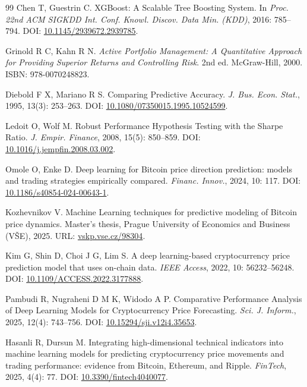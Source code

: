 \documentclass[12pt,a4paper]{ctexart}
\begin{document}
\begin{thebibliography}{99}
Chen T, Guestrin C.
XGBoost: A Scalable Tree Boosting System.
In \textit{Proc. 22nd ACM SIGKDD Int. Conf. Knowl. Discov. Data Min. (KDD)}, 2016: 785--794.
DOI: \href{https://doi.org/10.1145/2939672.2939785}{10.1145/2939672.2939785}.

Grinold R C, Kahn R N.
\textit{Active Portfolio Management: A Quantitative Approach for Providing Superior Returns and Controlling Risk}. 2nd ed. McGraw-Hill, 2000.
ISBN: 978-0070248823.

Diebold F X, Mariano R S.
Comparing Predictive Accuracy.
\textit{J. Bus. Econ. Stat.}, 1995, 13(3): 253--263.
DOI: \href{https://doi.org/10.1080/07350015.1995.10524599}{10.1080/07350015.1995.10524599}.

Ledoit O, Wolf M.
Robust Performance Hypothesis Testing with the Sharpe Ratio.
\textit{J. Empir. Finance}, 2008, 15(5): 850--859.
DOI: \href{https://doi.org/10.1016/j.jempfin.2008.03.002}{10.1016/j.jempfin.2008.03.002}.

Omole O, Enke D.
Deep learning for Bitcoin price direction prediction: models and trading strategies empirically compared.
\textit{Financ. Innov.}, 2024, 10: 117.
DOI: \href{https://doi.org/10.1186/s40854-024-00643-1}{10.1186/s40854-024-00643-1}.

Kozhevnikov V.
Machine Learning techniques for predictive modeling of Bitcoin price dynamics.
Master's thesis, Prague University of Economics and Business (VŠE), 2025.
URL: \href{https://vskp.vse.cz/98304}{vskp.vse.cz/98304}.

Kim G, Shin D, Choi J G, Lim S.
A deep learning-based cryptocurrency price prediction model that uses on-chain data.
\textit{IEEE Access}, 2022, 10: 56232--56248.
DOI: \href{https://doi.org/10.1109/ACCESS.2022.3177888}{10.1109/ACCESS.2022.3177888}.

Pambudi R, Nugraheni D M K, Widodo A P.
Comparative Performance Analysis of Deep Learning Models for Cryptocurrency Price Forecasting.
\textit{Sci. J. Inform.}, 2025, 12(4): 743--756.
DOI: \href{https://doi.org/10.15294/sji.v12i4.35653}{10.15294/sji.v12i4.35653}.

Hasanli R, Dursun M.
Integrating high-dimensional technical indicators into machine learning models for predicting cryptocurrency price movements and trading performance: evidence from Bitcoin, Ethereum, and Ripple.
\textit{FinTech}, 2025, 4(4): 77.
DOI: \href{https://doi.org/10.3390/fintech4040077}{10.3390/fintech4040077}.


\end{thebibliography}
\end{document}
